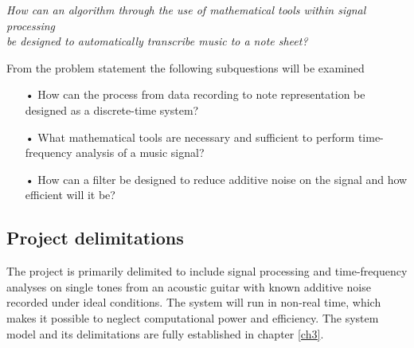 \begin{center}
\textit{How can an algorithm through the use of mathematical tools within signal processing  \\
be designed to automatically transcribe music to a note sheet?}
\end{center}

From the problem statement the following subquestions will be examined 
\begin{itemize}
\item[•] How can the process from data recording to note representation be designed as a discrete-time system?
\item[•] What mathematical tools are necessary and sufficient to perform time-frequency analysis of a music signal?  
\item[•] How can a filter be designed to reduce additive noise on the signal and how efficient will it be? 
\end{itemize}

\subsection{Project delimitations}
The project is primarily delimited to include signal processing and time-frequency analyses on single tones from an acoustic guitar with known additive noise recorded under ideal conditions. The system will run in non-real time, which makes it possible to neglect computational power and efficiency. The system model and its delimitations are fully established in chapter \ref{ch3}.




